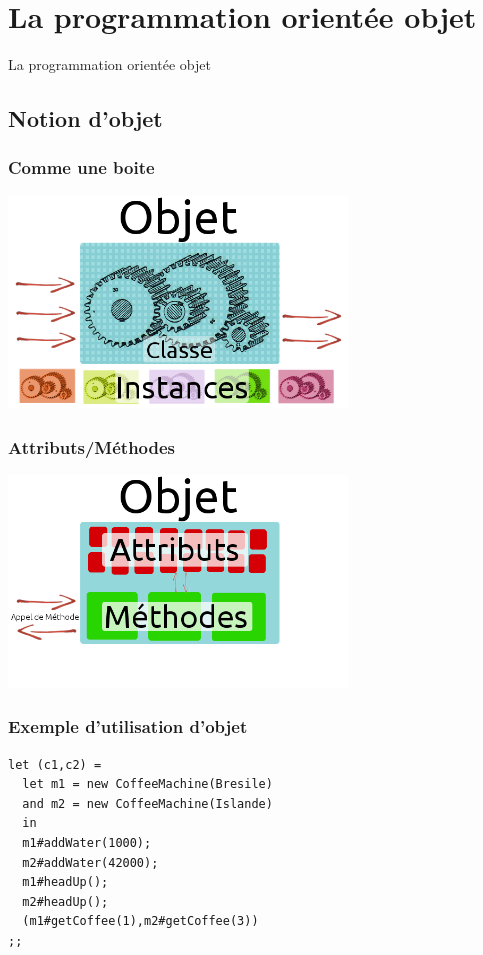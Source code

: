 \section{La programmation orientée objet}
\begin{frame}
	\begin{center}
	\huge
	La programmation orientée objet
	\end{center}
\end{frame}

\subsection{Notion d'objet} %
\begin{frame}
	\frametitle{Comme une boite}
	\begin{center}
	\includegraphics[width=9cm]{pics/explObj1.png}
	\end{center}
\end{frame}
\begin{frame}
	\frametitle{Attributs/Méthodes}
	\begin{center}
	\includegraphics[width=9cm]{pics/explObj2.png}
	\end{center}
\end{frame}
\begin{frame}[fragile]
	\frametitle{Exemple d'utilisation d'objet}
	\begin{lstlisting}
let (c1,c2) =
  let m1 = new CoffeeMachine(Bresile)
  and m2 = new CoffeeMachine(Islande)
  in
  m1#addWater(1000);
  m2#addWater(42000);
  m1#headUp();
  m2#headUp();
  (m1#getCoffee(1),m2#getCoffee(3))
;;
	\end{lstlisting}
\end{frame}

